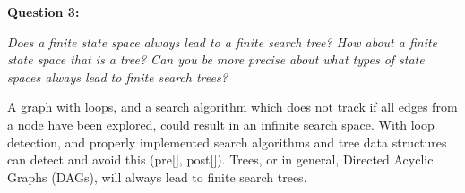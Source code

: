 \noindent\textbf{Question 3:}

\noindent\emph{Does a finite state space always lead to a finite search tree? How about a finite state space that is a tree? Can you be more precise about what types of state spaces always lead to finite search trees?}


A graph with loops, and a search algorithm which does not track if all edges from a node have been explored, could result in an infinite search space. With loop detection, and properly implemented search algorithms and tree data structures can detect and avoid this (pre[], post[]). Trees, or in general, Directed Acyclic Graphs (DAGs), will always lead to finite search trees. 

